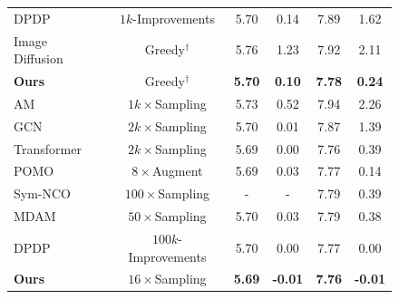 \documentclass{article}
\theoremstyle{plain}
\theoremstyle{definition}
\theoremstyle{remark}
\begin{document}
\begin{figure}
\begin{minipage}{0.62\textwidth}
\begin{center}
\begin{small}
\begin{sc}
{\begin{tabular}{lccccc}
DPDP & $1k$-Improvements & 5.70 & 0.14 & 7.89 & 1.62\\
Image Diffusion & Greedy$^\dag$ & 5.76 & 1.23 & 7.92 & 2.11\\
\textbf{Ours} & Greedy$^\dag$ & \textbf{5.70} & \textbf{0.10} & \textbf{7.78} & \textbf{0.24} \\
\midrule
AM & $1k\times$Sampling & 5.73 & 0.52 & 7.94 & 2.26 \\
GCN & $2k\times$Sampling & 5.70 & 0.01 & 7.87 & 1.39 \\
Transformer & $2k\times$Sampling & 5.69 & 0.00 & 7.76 & 0.39 \\
POMO & $8\times$Augment & 5.69 & 0.03 & 7.77 & 0.14 \\
Sym-NCO & $100\times$Sampling & - & - & 7.79 & 0.39 \\
MDAM & $50\times$Sampling & 5.70 & 0.03 & 7.79 & 0.38 \\
DPDP & $100k$-Improvements & 5.70 & 0.00 & 7.77 & 0.00 \\
\textbf{Ours} & $16\times$Sampling & \textbf{5.69} & \textbf{-0.01} & \textbf{7.76} & \textbf{-0.01} \\
\bottomrule
\end{tabular}
}
\end{sc}
\end{small}
\end{center}
\vskip -0.1in
\setlength{\tabcolsep}{6pt}
\end{minipage}
\end{figure}
\end{document}
